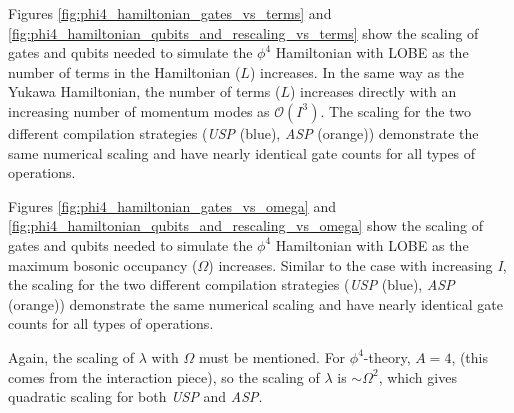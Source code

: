 Figures \ref{fig:phi4_hamiltonian_gates_vs_terms} and \ref{fig:phi4_hamiltonian_qubits_and_rescaling_vs_terms} show the scaling of gates and qubits needed to simulate the $\phi^4$ Hamiltonian with LOBE as the number of terms in the Hamiltonian ($L$) increases. 
In the same way as the Yukawa Hamiltonian, the number of terms ($L$) increases directly with an increasing number of momentum modes as $\mathcal{O}(I^3)$. The scaling for the two different compilation strategies (\textit{USP} (blue), \textit{ASP} (orange)) demonstrate the same numerical scaling and have nearly identical gate counts for all types of operations. 

Figures \ref{fig:phi4_hamiltonian_gates_vs_omega} and \ref{fig:phi4_hamiltonian_qubits_and_rescaling_vs_omega} show the scaling of gates and qubits needed to simulate the $\phi^4$ Hamiltonian with LOBE as the maximum bosonic occupancy ($\Omega$) increases. Similar to the case with increasing \textit{I}, the scaling for the two different compilation strategies (\textit{USP} (blue), \textit{ASP} (orange)) demonstrate the same numerical scaling and have nearly identical gate counts for all types of operations. 

Again, the scaling of $\lambda$ with $\Omega$ must be mentioned. For $\phi^4$-theory, $A = 4$, (this comes from the interaction piece), so the scaling of $\lambda$ is $\sim \Omega^2$, which gives quadratic scaling for both \textit{USP} and \textit{ASP}.


